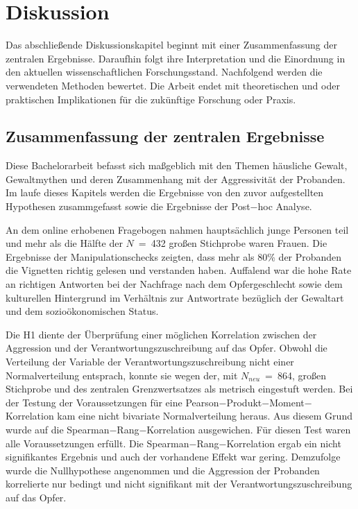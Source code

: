 \chapter{Diskussion}   \label{ch_5}
Das abschließende Diskussionskapitel beginnt mit einer Zusammenfassung der zentralen Ergebnisse. Daraufhin folgt ihre Interpretation und die Einordnung in den aktuellen wissenschaftlichen Forschungsstand. Nachfolgend werden die verwendeten Methoden bewertet. Die Arbeit endet mit theoretischen und oder praktischen Implikationen für die zukünftige Forschung oder Praxis.


\section{Zusammenfassung der zentralen Ergebnisse}  \label{sec_5.1}
Diese Bachelorarbeit befasst sich maßgeblich mit den Themen häusliche Gewalt, Gewaltmythen und deren Zusammenhang mit der Aggressivität der Probanden. Im laufe dieses Kapitels werden die Ergebnisse von den zuvor aufgestellten Hypothesen zusammgefasst sowie die Ergebnisse der Post$-$hoc Analyse.

An dem online erhobenen Fragebogen nahmen hauptsächlich junge Personen teil und mehr als die Hälfte der $N$~=~432 großen Stichprobe waren Frauen. 
Die Ergebnisse der Manipulationschecks zeigten, dass mehr als 80\% der Probanden die Vignetten richtig gelesen und verstanden haben. Auffalend war die hohe Rate an richtigen Antworten bei der Nachfrage nach dem Opfergeschlecht sowie dem kulturellen Hintergrund im Verhältnis zur Antwortrate bezüglich der Gewaltart und dem sozioökonomischen Status.


Die H1 diente der Überprüfung einer möglichen Korrelation zwischen der Aggression und der Verantwortungszuschreibung auf das Opfer. Obwohl die Verteilung der Variable der Verantwortungszuschreibung nicht einer Normalverteilung entsprach, konnte sie wegen der, mit $N_{neu}$~=~864, großen Stichprobe und des zentralen Grenzwertsatzes als metrisch eingestuft werden. 
Bei der Testung der Voraussetzungen für eine Pearson$-$Produkt$-$Moment$-$Korrelation kam eine nicht bivariate Normalverteilung heraus. Aus diesem Grund wurde auf die Spearman$-$Rang$-$Korrelation ausgewichen. Für diesen Test waren alle Voraussetzungen erfüllt. Die Spearman$-$Rang$-$Korrelation ergab ein nicht signifikantes Ergebnis und auch der vorhandene Effekt war gering. Demzufolge wurde die Nullhypothese angenommen und die Aggression der Probanden korrelierte nur bedingt und nicht signifikant mit der Verantwortungszuschreibung auf das Opfer.

